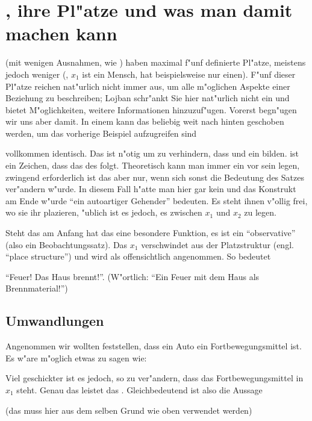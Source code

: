 \section{, ihre Pl"atze und was man damit machen kann}
 (mit wenigen Ausnahmen, wie ) haben maximal f"unf definierte Pl"atze, meistens jedoch weniger (, $x_1$ ist ein Mensch, hat beispielsweise nur einen). F"unf dieser Pl"atze reichen nat"urlich nicht immer aus, um alle m"oglichen Aspekte einer Beziehung zu beschreiben; Lojban schr"ankt Sie hier nat"urlich nicht ein und
bietet M"oglichkeiten, weitere Informationen hinzuzuf"ugen. Vorerst begn"ugen wir uns aber damit.
In einem  kann das  beliebig weit nach hinten geschoben werden, um das vorherige Beispiel aufzugreifen sind
\begin{quote}
\end{quote}
vollkommen identisch. Das  ist n"otig um zu verhindern, dass  und  ein  bilden.  ist ein Zeichen, dass das  des
 folgt. Theoretisch kann man immer ein  vor sein  legen, zwingend erforderlich ist das aber nur, wenn sich sonst
die Bedeutung des Satzes ver"andern w"urde. In diesem Fall h"atte man hier gar kein  und das Konstrukt am Ende w"urde ``ein autoartiger Gehender'' bedeuten.
Es steht ihnen v"ollig frei, wo sie ihr  plazieren, "ublich ist es jedoch, es zwischen $x_1$ und $x_2$ zu legen.

Steht das  am Anfang hat das  eine besondere Funktion, es ist ein ``observative'' (also ein Beobachtungssatz). Das $x_1$ verschwindet aus der Platzstruktur
(engl. ``place structure'') und wird als offensichtlich angenommen. So bedeutet
\begin{quote}
\end{quote}
``Feuer! Das Haus brennt!''. (W"ortlich: ``Ein Feuer mit dem Haus als Brennmaterial!'')

\subsection{Umwandlungen}
Angenommen wir wollten feststellen, dass ein Auto ein Fortbewegungsmittel ist. Es w"are m"oglich etwas zu sagen wie:
\begin{quote}
\end{quote}
Viel geschickter ist es jedoch,  so zu ver"andern, dass das Fortbewegungsmittel in $x_1$ steht. Genau das leistet das  .
Gleichbedeutend ist also die Aussage
\begin{quote}
\end{quote}
(das  muss hier aus dem selben Grund wie oben verwendet werden)

